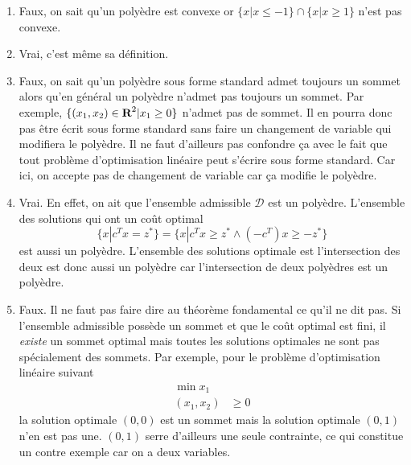 \begin{enumerate}
    \begin{solution}
      \begin{enumerate}
        \item Faux, on sait qu'un polyèdre est convexe or
          $\{x | x \leq -1\} \cap \{x | x \geq 1\}$ n'est pas convexe.
        \item Vrai, c'est même sa définition.
        \item Faux, on sait qu'un polyèdre sous forme standard admet
          toujours un sommet alors qu'en général un polyèdre n'admet pas
          toujours un sommet.
          Par exemple, $\{(x_1,x_2) \in {\mbox{\bf R}}^2 | x_1 \geq 0\}$ n'admet
          pas de sommet. Il en pourra donc pas être écrit sous forme standard
          sans faire un changement de variable qui modifiera le polyèdre.
          Il ne faut d'ailleurs pas confondre ça avec le fait que tout
          problème d'optimisation linéaire peut s'écrire sous forme standard.
          Car ici, on accepte pas de changement de variable car ça
          modifie le polyèdre.
        \item Vrai. En effet, on ait que l'ensemble admissible $\mathcal{D}$
          est un polyèdre.
          L'ensemble des solutions qui ont un coût optimal
          \[ \{x | c^T x = z^*\} =
          \{x | c^T x \geq z^* \land (-c^T) x \geq -z^*\} \]
          est aussi un polyèdre.
          L'ensemble des solutions optimale est l'intersection des deux est
          donc aussi un polyèdre car l'intersection de deux polyèdres est
          un polyèdre.
        \item Faux.
          Il ne faut pas faire dire au théorème fondamental
          ce qu'il ne dit pas.
          Si l'ensemble admissible possède un sommet et que le coût
          optimal est fini,
          il \emph{existe} un sommet optimal mais
          toutes les solutions optimales ne sont
          pas spécialement des sommets.
          Par exemple, pour le problème d'optimisation linéaire suivant
          \begin{align*}
            \min x_1\\
            (x_1,x_2) & \geq 0
          \end{align*}
          la solution optimale $(0,0)$ est un sommet mais la solution
          optimale $(0,1)$
          n'en est pas une.
          $(0,1)$ serre d'ailleurs une seule contrainte,
          ce qui constitue un contre exemple car on a deux variables.
      \end{enumerate}
    \end{solution}

\end{enumerate}
